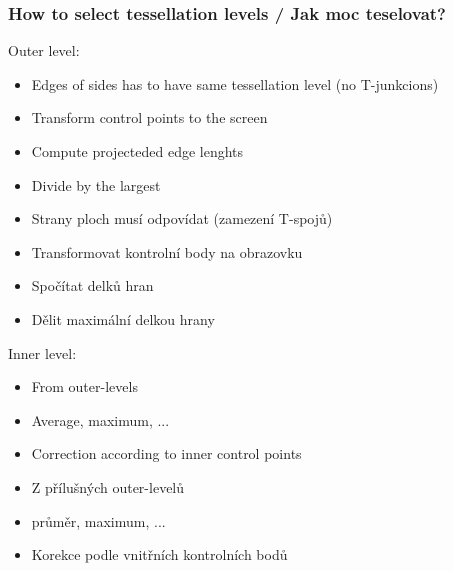 \begin{frame}\frametitle{How to select tessellation levels / Jak moc teselovat?}
  \scriptsize
	Outer level:
	\begin{itemize}
	\item Edges of sides has to have same tessellation level (no T-junkcions)
	\item Transform control points to the screen
	\item Compute projecteded edge lenghts
	\item Divide by the largest
	\end{itemize}
	\begin{itemize}
	\item Strany ploch musí odpovídat (zamezení T-spojů)
	\item Transformovat kontrolní body na obrazovku
	\item Spočítat delků hran
	\item Dělit maximální delkou hrany
	\end{itemize}
	Inner level:
	\begin{itemize}
	\item From outer-levels
	\item Average, maximum, ...
	\item Correction according to inner control points
	\end{itemize}
	\begin{itemize}
	\item Z přílušných outer-levelů
	\item průměr, maximum, ...
	\item Korekce podle vnitřních kontrolních bodů
	\end{itemize}
\end{frame}

